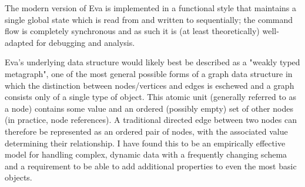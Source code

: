 The modern version of Eva is implemented in a functional style that maintains a single global state which is read from and written to sequentially; the command flow is completely synchronous and as such it is (at least theoretically) well-adapted for debugging and analysis.

Eva's underlying data structure would likely best be described as a "weakly typed metagraph", one of the most general possible forms of a graph data structure in which the distinction between nodes/vertices and edges is eschewed and a graph consists only of a single type of object. This atomic unit (generally referred to as a node) contains some value and an ordered (possibly empty) set of other nodes (in practice, node references). A traditional directed edge between two nodes can therefore be represented as an ordered pair of nodes, with the associated value determining their relationship. I have found this to be an empirically effective model for handling complex, dynamic data with a frequently changing schema and a requirement to be able to add additional properties to even the most basic objects.
